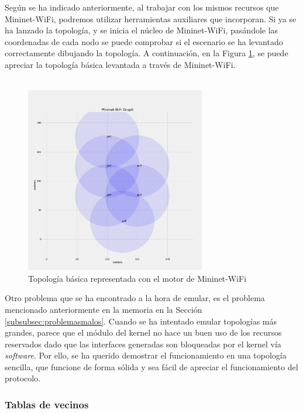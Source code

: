 Según se ha indicado anteriormente, al trabajar con los mismos recursos que Mininet-WiFi, podremos utilizar herramientas auxiliares que incorporan. Si ya se ha lanzado la topología, y se inicia el núcleo de Mininet-WiFi, pasándole las coordenadas de cada nodo se puede comprobar si el escenario se ha levantado correctamente dibujando la topología. A continuación, en la Figura \ref{fig:topo_val_mininetWifi}, se puede apreciar la topología básica levantada a través de Mininet-WiFi.\\
\\

\begin{figure}[ht]
    \centering
    \includegraphics[width=0.7\textwidth]{archivos/img/dev/topo_val_mininetWifi.png}
    \caption{Topología básica representada con el motor de Mininet-WiFi}
    \label{fig:topo_val_mininetWifi}
\end{figure}

Otro problema que se ha encontrado a la hora de emular, es el problema mencionado anteriormente en la memoria en la Sección \ref{subsubsec:problemasmalos}. Cuando se ha intentado emular topologías más grandes, parece que el módulo del kernel no hace un buen uso de los recursos reservados dado que las interfaces generadas son bloqueadas por el kernel vía \textit{software}. Por ello, se ha querido demostrar el funcionamiento en una topología sencilla, que funcione de forma sólida y sea fácil de apreciar el funcionamiento del protocolo.

\newpage

\subsubsection{Tablas de vecinos}

